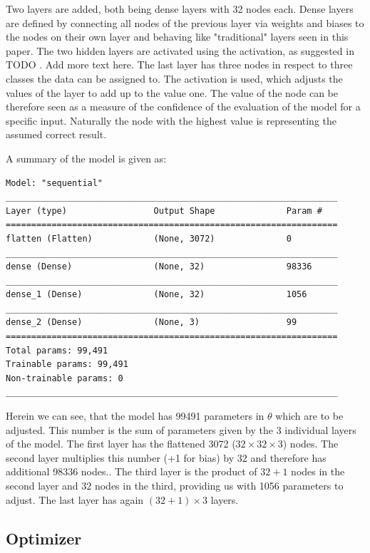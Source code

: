 Two layers are added, both being dense layers with 32 nodes each.
Dense layers are defined by connecting all nodes of the previous layer via weights and biases to the nodes on their own layer and behaving like "traditional" layers seen in this paper.
The two hidden layers are activated using the  activation, as suggested in TODO . Add more text here.
The last layer has three nodes in respect to three classes the data can be assigned to. The  activation is used, which adjusts the values of the layer to add up to the value one. The value of the node can be therefore seen as a measure of the confidence of the evaluation of the model for a specific input. Naturally the node with the highest value is representing the assumed correct result.

A summary of the model is given as:
\begin{lstlisting}
Model: "sequential"
_________________________________________________________________
Layer (type)                 Output Shape              Param #   
=================================================================
flatten (Flatten)            (None, 3072)              0         
_________________________________________________________________
dense (Dense)                (None, 32)                98336     
_________________________________________________________________
dense_1 (Dense)              (None, 32)                1056      
_________________________________________________________________
dense_2 (Dense)              (None, 3)                 99        
=================================================================
Total params: 99,491
Trainable params: 99,491
Non-trainable params: 0
_________________________________________________________________
\end{lstlisting}

Herein we can see, that the model has 99491 parameters in $\theta$ which are to be adjusted. This number is the sum of parameters given by the 3 individual layers of the model.
The first layer has the flattened 3072 ($32 \times 32 \times 3$) nodes.
The second layer multiplies this number (+1 for bias) by $32$ and therefore has additional 98336 nodes..
The third layer is the product of $32 + 1$ nodes in the second layer and $32$ nodes in the third, providing us with 1056 parameters to adjust.
The last layer has again $(32 + 1) \times 3$ layers.

\subsection{Optimizer}


